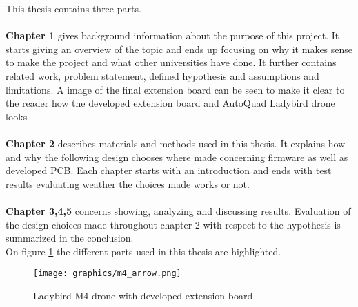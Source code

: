 This thesis contains three parts.\\ \\
\textbf{Chapter 1} gives background information about the purpose of this project. It starts giving an overview of the topic and ends up focusing on why it makes sense to make the project and what other universities have done. It further contains related work,  problem statement, defined hypothesis and assumptions and limitations. A image of the final extension board can be seen to make it clear to the reader how the developed extension board and AutoQuad Ladybird drone looks\\ \\
\textbf{Chapter 2} describes materials and methods used in this thesis. It explains how and why the following design chooses where made concerning firmware as well as developed PCB. Each chapter starts with an introduction and ends with test results evaluating weather the choices made works or not.\\ \\
\textbf{Chapter 3,4,5} concerns showing, analyzing and discussing results. Evaluation of the design choices made throughout chapter 2 with respect to the hypothesis is summarized in the conclusion. \\


On figure \ref{fig:drone_with_arrows} the different parts used in this thesis are highlighted.

\begin{figure}[H]
    \center
    \texttt{[image: graphics/m4\_arrow.png]}
  \caption{Ladybird M4 drone with developed extension board}
  \label{fig:drone_with_arrows}
\end{figure}